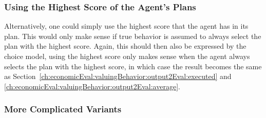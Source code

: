 



\subsubsection{Using the Highest Score of the Agent's Plans}
Alternatively, one could simply use the highest score that the agent has in its plan.  This would only make sense if  true behavior is assumed to always select the plan with the highest score.  Again, this should then also be expressed by the choice model, \ie using the highest score only makes sense when the agent always selects the plan with the highest score, in which case the result becomes the same as Section~\ref{ch:economicEval:valuingBehavior:output2Eval:executed} and \ref{ch:economicEval:valuingBehavior:output2Eval:average}.

\subsubsection{More Complicated Variants}
\label{sec:more-compl-variants}


